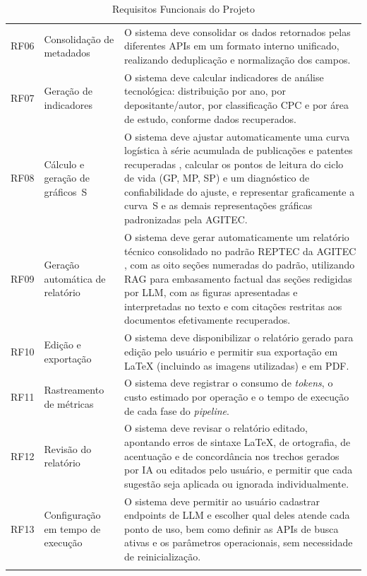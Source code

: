 \documentclass[12pt, a4paper]{article}
\begin{document}
\begin{longtable}{>{\centering\arraybackslash}p{0.6cm}
                  >{\raggedright\arraybackslash}p{3.2cm}
                  >{\raggedright\arraybackslash}p{8.5cm}}
RF06 & Consolidação de metadados &
O sistema deve consolidar os dados retornados pelas diferentes APIs em um
formato interno unificado, realizando deduplicação e normalização dos campos. \\[4pt] \addlinespace[8pt]

RF07 & Geração de indicadores &
O sistema deve calcular indicadores de análise tecnológica: distribuição por
ano, por depositante/autor, por classificação CPC e por área de estudo, conforme dados recuperados. \\[4pt] \addlinespace[8pt]

RF08 & Cálculo e geração de gráficos~S &
O sistema deve ajustar automaticamente uma curva logística à série acumulada
de publicações e patentes recuperadas \cite{fisherpry1971}, calcular os pontos
de leitura do ciclo de vida (GP, MP, SP) e um diagnóstico de confiabilidade do
ajuste, e representar graficamente a curva~S e as demais representações
gráficas padronizadas pela AGITEC. \\[4pt] \addlinespace[8pt]

RF09 & Geração automática de relatório &
O sistema deve gerar automaticamente um relatório técnico consolidado no padrão
REPTEC da AGITEC \cite{agitec2024, reptec2023tetra}, com as oito seções numeradas
do padrão, utilizando RAG \cite{lewis2020} para embasamento factual das seções
redigidas por LLM, com as figuras apresentadas e interpretadas no texto e com
citações restritas aos documentos efetivamente recuperados. \\[4pt] \addlinespace[8pt]

RF10 & Edição e exportação &
O sistema deve disponibilizar o relatório gerado para edição pelo usuário e
permitir sua exportação em LaTeX (incluindo as imagens utilizadas) e em PDF. \\[4pt] \addlinespace[8pt]

RF11 & Rastreamento de métricas &
O sistema deve registrar o consumo de \textit{tokens}, o custo estimado por
operação e o tempo de execução de cada fase do \textit{pipeline}. \\[4pt] \addlinespace[8pt]

RF12 & Revisão do relatório &
O sistema deve revisar o relatório editado, apontando erros de sintaxe LaTeX,
de ortografia, de acentuação e de concordância nos trechos gerados por IA ou
editados pelo usuário, e permitir que cada sugestão seja aplicada ou ignorada
individualmente. \\[4pt] \addlinespace[8pt]

RF13 & Configuração em tempo de execução &
O sistema deve permitir ao usuário cadastrar endpoints de LLM e escolher qual
deles atende cada ponto de uso, bem como definir as APIs de busca ativas e os
parâmetros operacionais, sem necessidade de reinicialização. \\

\bottomrule
\caption{Requisitos Funcionais do Projeto}
\label{tab:rf}
\end{longtable}
\endgroup
\end{document}
